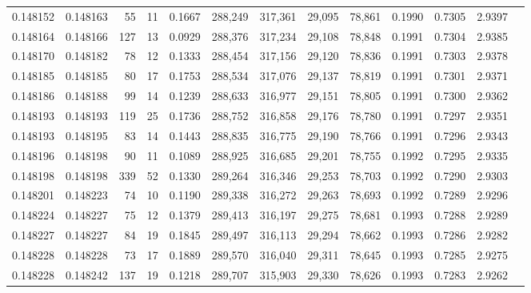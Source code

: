 \begin{tabular}{rrrrrrrrrrrrr}
0.148152 & 0.148163 &    55 &  11 &                                     0.1667 & 288,249 & 317,361 &  29,095 &  78,861 & 0.1990 & 0.7305 & 2.9397 \\
0.148164 & 0.148166 &   127 &  13 &                                     0.0929 & 288,376 & 317,234 &  29,108 &  78,848 & 0.1991 & 0.7304 & 2.9385 \\
0.148170 & 0.148182 &    78 &  12 &                                     0.1333 & 288,454 & 317,156 &  29,120 &  78,836 & 0.1991 & 0.7303 & 2.9378 \\
0.148185 & 0.148185 &    80 &  17 &                                     0.1753 & 288,534 & 317,076 &  29,137 &  78,819 & 0.1991 & 0.7301 & 2.9371 \\
0.148186 & 0.148188 &    99 &  14 &                                     0.1239 & 288,633 & 316,977 &  29,151 &  78,805 & 0.1991 & 0.7300 & 2.9362 \\
0.148193 & 0.148193 &   119 &  25 &                                     0.1736 & 288,752 & 316,858 &  29,176 &  78,780 & 0.1991 & 0.7297 & 2.9351 \\
0.148193 & 0.148195 &    83 &  14 &                                     0.1443 & 288,835 & 316,775 &  29,190 &  78,766 & 0.1991 & 0.7296 & 2.9343 \\
0.148196 & 0.148198 &    90 &  11 &                                     0.1089 & 288,925 & 316,685 &  29,201 &  78,755 & 0.1992 & 0.7295 & 2.9335 \\
0.148198 & 0.148198 &   339 &  52 &                                     0.1330 & 289,264 & 316,346 &  29,253 &  78,703 & 0.1992 & 0.7290 & 2.9303 \\
0.148201 & 0.148223 &    74 &  10 &                                     0.1190 & 289,338 & 316,272 &  29,263 &  78,693 & 0.1992 & 0.7289 & 2.9296 \\
0.148224 & 0.148227 &    75 &  12 &                                     0.1379 & 289,413 & 316,197 &  29,275 &  78,681 & 0.1993 & 0.7288 & 2.9289 \\
0.148227 & 0.148227 &    84 &  19 &                                     0.1845 & 289,497 & 316,113 &  29,294 &  78,662 & 0.1993 & 0.7286 & 2.9282 \\
0.148228 & 0.148228 &    73 &  17 &                                     0.1889 & 289,570 & 316,040 &  29,311 &  78,645 & 0.1993 & 0.7285 & 2.9275 \\
0.148228 & 0.148242 &   137 &  19 &                                     0.1218 & 289,707 & 315,903 &  29,330 &  78,626 & 0.1993 & 0.7283 & 2.9262 \\

\end{tabular}
